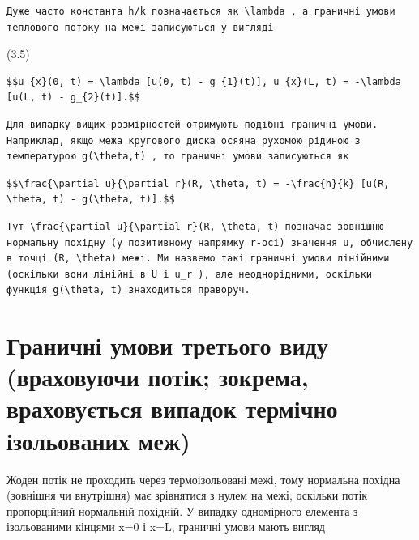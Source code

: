 \documentclass[
  ukrainian,
]{article}
\begin{document}
\begin{verbatim}
Дуже часто константа h/k позначається як \lambda , а граничні умови теплового потоку на межі записуються у вигляді
\end{verbatim}

(3.5)

\begin{verbatim}
$$u_{x}(0, t) = \lambda [u(0, t) - g_{1}(t)], u_{x}(L, t) = -\lambda [u(L, t) - g_{2}(t)].$$
\end{verbatim}

\begin{verbatim}
Для випадку вищих розмірностей отримують подібні граничні умови. Наприклад, якщо межа кругового диска осяяна рухомою рідиною з температурою g(\theta,t) , то граничні умови записуються як
\end{verbatim}

\begin{verbatim}
$$\frac{\partial u}{\partial r}(R, \theta, t) = -\frac{h}{k} [u(R, \theta, t) - g(\theta, t)].$$
\end{verbatim}

\begin{verbatim}
Тут \frac{\partial u}{\partial r}(R, \theta, t) позначає зовнішню нормальну похідну (у позитивному напрямку r-осі) значення u, обчислену в точці (R, \theta) межі. Ми назвемо такі граничні умови лінійними (оскільки вони лінійні в U і u_r ), але неоднорідними, оскільки функція g(\theta, t) знаходиться праворуч.
\end{verbatim}

\section{Граничні умови третього виду (враховуючи потік; зокрема,
враховується випадок термічно ізольованих
меж)}\label{ux433ux440ux430ux43dux438ux447ux43dux456-ux443ux43cux43eux432ux438-ux442ux440ux435ux442ux44cux43eux433ux43e-ux432ux438ux434ux443-ux432ux440ux430ux445ux43eux432ux443ux44eux447ux438-ux43fux43eux442ux456ux43a-ux437ux43eux43aux440ux435ux43cux430-ux432ux440ux430ux445ux43eux432ux443ux454ux442ux44cux441ux44f-ux432ux438ux43fux430ux434ux43eux43a-ux442ux435ux440ux43cux456ux447ux43dux43e-ux456ux437ux43eux43bux44cux43eux432ux430ux43dux438ux445-ux43cux435ux436}

Жоден потік не проходить через термоізольовані межі, тому нормальна
похідна (зовнішня чи внутрішня) має зрівнятися з нулем на межі, оскільки
потік пропорційний нормальній похідній. У випадку одномірного елемента з
ізольованими кінцями x=0 і x=L, граничні умови мають вигляд
\end{document}
